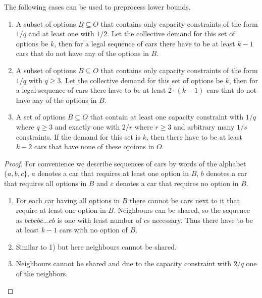 \documentclass[]{llncs}
\begin{document}
\begin{proposition}
    The following cases can be used to preprocess lower bounds. 
\begin{enumerate}
    \item A subset of options $B\subseteq O$ that contains only  capacity constraints of the form $1/q$ and at least one
        with $1/2$. Let the collective demand for this set of options be $k$, then for a legal sequence of cars there
        have to be at least $k-1$ cars that do not have any of the options in $B$. 
    \item A subset of options $B\subseteq O$ that contains only capacity constraints of the form $1/q$ with $q \geq 3$.
        Let the collective demand for this set of options be $k$, then for a legal sequence of cars there have to be at
        least $2\cdot (k-1)$ cars that do not have any of the options in $B$. 
    \item A set of options $B\subseteq O$ that contain at least one capacity constraint with $1/q$ where $q \geq 3$ and
        exactly one with $2/r$ where $r \geq 3$ and arbitrary many $1/s$ constraints. If the demand for this set is $k$,
        then there have to be at least $k-2$ cars that have none of these options in $O$. 
\end{enumerate}

\end{proposition}

\begin{proof}
    For convenience we describe sequences of cars by words of the alphabet $\{a,b,c\}$, $a$ denotes a car that requires
    at least one option in $B$, $b$ denotes a car that requires all options in $B$ and $c$ denotes a car that requires
    no option in $B$. 
    \begin{enumerate}
        \item For each car having all options in $B$ there cannot be cars next to it that require at least one option in
            $B$.  Neighbours can be shared, so the sequence as $bcbcbc\ldots cb$ is one with least number of $c$s
            necessary. Thus there have to be at least $k-1$ cars with no option of $B$. 
        \item Similar to 1) but here neighbours cannot be shared. 
        \item Neighbours cannot be shared and due to the capacity constraint with $2/q$ one of the neighbors. 
    \end{enumerate}
\end{proof}
\end{document}
